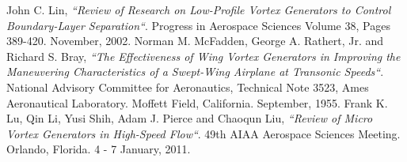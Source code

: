 \renewcommand{\bibname}{References}
\begin{thebibliography}{99}
  John C. Lin,
  \emph{``Review of Research on Low-Profile Vortex Generators to Control Boundary-Layer Separation``}. Progress in Aerospace Sciences Volume 38, Pages 389-420. November, 2002.
  Norman M. McFadden, George A. Rathert, Jr. and Richard S. Bray,
  \emph{``The Effectiveness of Wing Vortex Generators in Improving the Maneuvering Characteristics of a Swept-Wing Airplane at Transonic Speeds``}. National Advisory Committee for Aeronautics, Technical Note 3523, Ames Aeronautical Laboratory. Moffett Field, California. September, 1955.
Frank K. Lu, Qin Li, Yusi Shih, Adam J. Pierce and Chaoqun Liu,
  \emph{``Review of Micro Vortex Generators
in High-Speed Flow``}. 49th AIAA Aerospace Sciences Meeting. Orlando, Florida. 4 - 7 January, 2011.

\end{thebibliography}